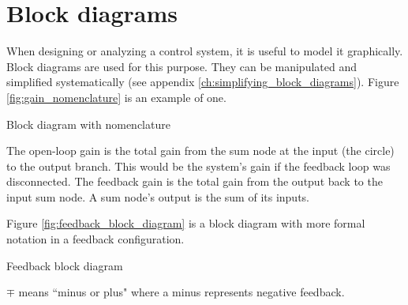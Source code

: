 \section{Block diagrams}

When designing or analyzing a \gls{control system}, it is useful to model it
graphically. Block diagrams are used for this purpose. They can be manipulated
and simplified systematically (see appendix
\ref{ch:simplifying_block_diagrams}). Figure \ref{fig:gain_nomenclature} is an
example of one.
\begin{bookfigure}

  \caption{Block diagram with nomenclature}
  \label{fig:gain_nomenclature}
\end{bookfigure}

The \gls{open-loop gain} is the total gain from the sum node at the input (the
circle) to the output branch. This would be the \gls{system}'s gain if the
feedback loop was disconnected. The \gls{feedback gain} is the total gain from
the output back to the input sum node. A sum node's output is the sum of its
inputs.

Figure \ref{fig:feedback_block_diagram} is a block diagram with more formal
notation in a feedback configuration.
\begin{bookfigure}

  \caption{Feedback block diagram}
  \label{fig:feedback_block_diagram}
\end{bookfigure}

$\mp$ means ``minus or plus" where a minus represents negative feedback.
